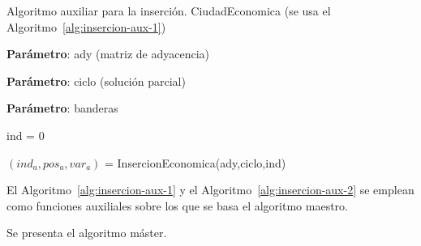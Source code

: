 \begin{algorithm}[H]
  \caption{Algoritmo auxiliar para la inserción. CiudadEconomica (se usa el Algoritmo~\ref{alg:insercion-aux-1})}\label{alg:insercion-aux-2}
  \begin{minipage}{0.92\textwidth}
    \textbf{Parámetro}: ady (matriz de adyacencia)

    \textbf{Parámetro}: ciclo (solución parcial)

    \textbf{Parámetro}: banderas
  \end{minipage}

  ind = 0\;


  $(ind_a, pos_a, var_a)$ = InsercionEconomica(ady,ciclo,ind)\;


  
\end{algorithm}

El Algoritmo~\ref{alg:insercion-aux-1} y el Algoritmo~\ref{alg:insercion-aux-2}
se emplean como funciones auxiliales sobre los que se basa el algoritmo maestro. 

Se presenta el algoritmo máster.

